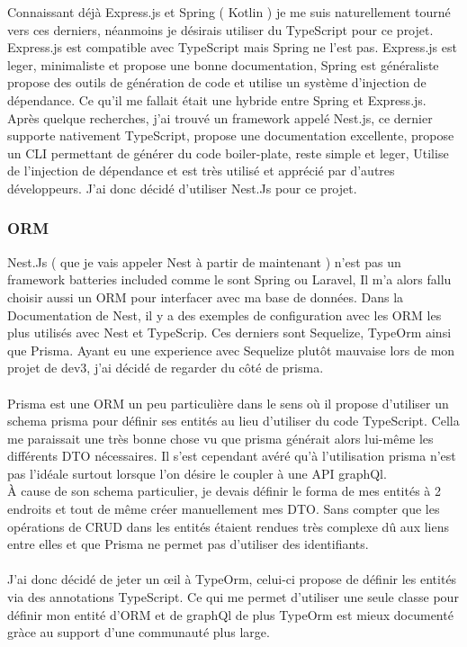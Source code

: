 Connaissant déjà Express.js et Spring ( Kotlin ) je me suis naturellement tourné vers ces derniers, néanmoins je désirais utiliser du TypeScript pour ce projet.
Express.js est compatible avec TypeScript mais Spring ne l'est pas.
Express.js est leger, minimaliste et propose une bonne documentation,
Spring est généraliste propose des outils de génération de code et utilise un système d'injection de dépendance.
Ce qu'il me fallait était une hybride entre Spring et Express.js.
Après quelque recherches, j'ai trouvé un framework appelé Nest.js, ce dernier supporte nativement TypeScript, propose une documentation excellente,
propose un CLI permettant de générer du code boiler-plate, reste simple et leger, Utilise de l'injection de dépendance et est très utilisé et apprécié par d'autres développeurs.
J'ai donc décidé d'utiliser Nest.Js pour ce projet.

\subsubsection{ORM}
Nest.Js ( que je vais appeler Nest à partir de maintenant ) n'est pas un framework batteries included comme le sont Spring ou Laravel,
Il m'a alors fallu choisir aussi un ORM pour interfacer avec ma base de données.
Dans la Documentation de Nest, il y a des exemples de configuration avec les ORM les plus utilisés avec Nest et TypeScrip.
Ces derniers sont Sequelize, TypeOrm ainsi que Prisma.
Ayant eu une experience avec Sequelize plutôt mauvaise lors de mon projet de dev3, j'ai décidé de regarder du côté de prisma.\\\\

Prisma est une ORM un peu particulière dans le sens où il propose d'utiliser un schema prisma pour définir ses entités au lieu d'utiliser du code TypeScript.
Cella me paraissait une très bonne chose vu que prisma générait alors lui-même les différents DTO nécessaires.
Il s'est cependant avéré qu'à l'utilisation prisma n'est pas l'idéale surtout lorsque l'on désire le coupler à une API graphQl.\\

À cause de son schema particulier, je devais définir le forma de mes entités à 2 endroits et tout de même créer manuellement mes DTO\@.
Sans compter que les opérations de CRUD dans les entités étaient rendues très complexe dû aux liens entre elles et que Prisma ne permet pas d'utiliser des identifiants.\\\\
J'ai donc décidé de jeter un œil à TypeOrm, celui-ci propose de définir les entités via des annotations TypeScript.
Ce qui me permet d'utiliser une seule classe pour définir mon entité d'ORM et de graphQl de plus TypeOrm est mieux
documenté gràce au support d'une communauté plus large.

